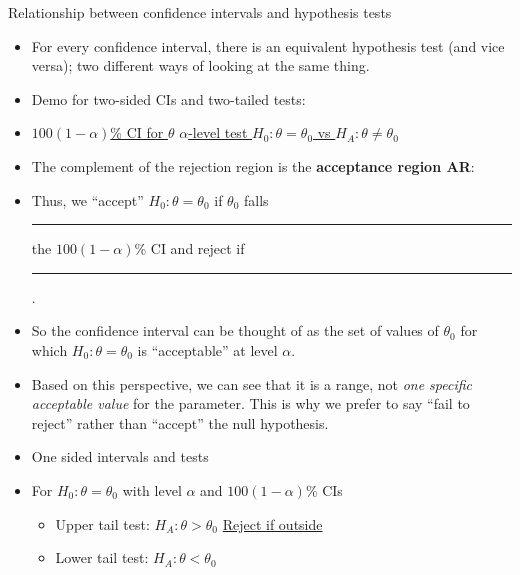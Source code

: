 \documentclass{article}
\newcommand{\blankul}[1]{\rule[-1.5mm]{#1}{0.15mm}}	%
\newcommand{\ho}{H_0}		%
\newcommand{\ha}{H_A}		%
\begin{document}
Relationship between confidence intervals and hypothesis tests\bigskip
\begin{itemize}
    \item For every confidence interval, there is an equivalent hypothesis test (and vice versa); two different ways of looking at the same thing.
    \item Demo for two-sided CIs and two-tailed tests:
    \item[] \ul{$100 (1 - \alpha)$\% CI for $\theta$} \hspace{60pt} \ul{$\alpha$-level test $\ho: \theta = \theta_0$ vs $\ha: \theta \ne \theta_0$}\vspace{40pt}
    \item The complement of the rejection region is the \textbf{acceptance region AR}\vspace{70pt}:
    \item Thus, we ``accept'' $\ho: \theta = \theta_0$ if $\theta_0$ falls \blankul{2cm} the $100 (1 - \alpha)$\% CI and reject if \blankul{2cm}.
    \item[] So the confidence interval can be thought of as the set of values  of $\theta_0$ for which $\ho: \theta = \theta_0$ is ``acceptable'' at level $\alpha$.
    \item[] Based on this perspective, we can see that it is a range, not \textit{one specific acceptable value} for the parameter. This is why we prefer to say ``fail to reject'' rather than ``accept'' the null hypothesis.
    \item One sided intervals and tests
    \item[] For $\ho: \theta = \theta_0$ with level $\alpha$ and $100 (1 - \alpha)$\% CIs
    \begin{itemize}
        \item Upper tail test: $\ha: \theta > \theta_0$ \hspace{30pt} \ul{Reject if outside}  \vspace{50pt}
        \item Lower tail test: $\ha: \theta < \theta_0$\vspace{30pt}
    \end{itemize}
\end{itemize}\bigskip
\end{document}
